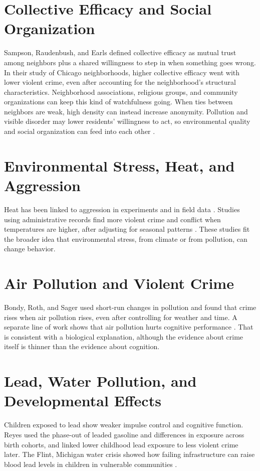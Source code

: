\documentclass[12pt,letterpaper]{report}
\begin{document}
\section{Collective Efficacy and Social Organization}
Sampson, Raudenbush, and Earls \cite{sampson1997} defined collective efficacy as mutual trust
among neighbors plus a shared willingness to step in when something goes wrong. In their
study of Chicago neighborhoods, higher collective efficacy went with lower violent crime,
even after accounting for the neighborhood's structural characteristics. Neighborhood
associations, religious groups, and community organizations can keep this kind of watchfulness
going. When ties between neighbors are weak, high density can instead increase anonymity.
Pollution and visible disorder may lower residents' willingness to act, so environmental
quality and social organization can feed into each other \cite{skogan1990}.

\section{Environmental Stress, Heat, and Aggression}
Heat has been linked to aggression in experiments and in field data \cite{anderson2000}.
Studies using administrative records find more violent crime and conflict when temperatures
are higher, after adjusting for seasonal patterns \cite{ranson2014,hsiang2013,burke2015}.
These studies fit the broader idea that environmental stress, from climate or from
pollution, can change behavior.

\section{Air Pollution and Violent Crime}
Bondy, Roth, and Sager \cite{bondy2020} used short-run changes in pollution and found that
crime rises when air pollution rises, even after controlling for weather and time. A separate
line of work shows that air pollution hurts cognitive performance \cite{chang2019}. That is
consistent with a biological explanation, although the evidence about crime itself is thinner
than the evidence about cognition.

\section{Lead, Water Pollution, and Developmental Effects}
Children exposed to lead show weaker impulse control and cognitive function. Reyes
\cite{reyes2007} used the phase-out of leaded gasoline and differences in exposure across
birth cohorts, and linked lower childhood lead exposure to less violent crime later. The
Flint, Michigan water crisis showed how failing infrastructure can raise blood lead levels
in children in vulnerable communities \cite{hanna2016,zahran2017}.
\end{document}
